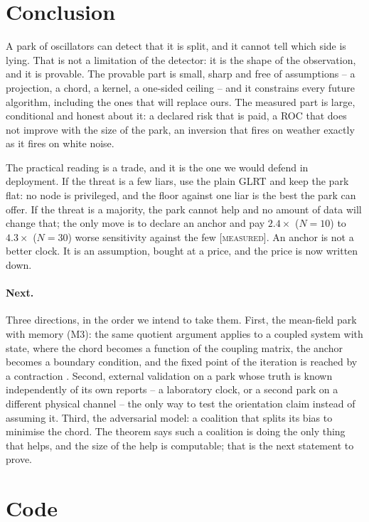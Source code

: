 \documentclass[10pt,twocolumn,a4paper]{article}
\newcommand{\measured}{\textcolor{blue!70!black}{\textsc{[measured]}}}
\theoremstyle{definition}
\theoremstyle{remark}
\begin{document}
\section{Conclusion}
\label{sec:conclusion}

A park of oscillators can detect that it is split, and it cannot tell which side
is lying. That is not a limitation of the detector: it is the shape of the
observation, and it is provable. The provable part is small, sharp and free of
assumptions -- a projection, a chord, a kernel, a one-sided ceiling -- and it
constrains every future algorithm, including the ones that will replace ours. The
measured part is large, conditional and honest about it: a declared risk that is
paid, a ROC that does not improve with the size of the park, an inversion that
fires on weather exactly as it fires on white noise.

The practical reading is a trade, and it is the one we would defend in
deployment. If the threat is a few liars, use the plain GLRT and keep the park
flat: no node is privileged, and the floor against one liar is the best the park
can offer. If the threat is a majority, the park cannot help and no amount of data
will change that; the only move is to declare an anchor and pay $2.4\times$
($N=10$) to $4.3\times$ ($N=30$) worse sensitivity against the few \measured. An
anchor is not a better clock. It is an assumption, bought at a price, and the
price is now written down.

\paragraph{Next.} Three directions, in the order we intend to take them. First,
the mean-field park with memory (M3): the same quotient argument applies to a
coupled system with state, where the chord becomes a function of the coupling
matrix, the anchor becomes a boundary condition, and the fixed point of the
iteration is reached by a contraction \cite{banach1922}. Second, external validation
on a park whose truth is known independently of its own reports -- a laboratory
clock, or a second park on a different physical channel -- the only way to test
the orientation claim instead of assuming it. Third, the adversarial model: a
coalition that splits its bias to minimise the chord. The theorem says such a
coalition is doing the only thing that helps, and the size of the help is
computable; that is the next statement to prove.

\appendix

\section{Code}
\label{app:code}
\end{document}
